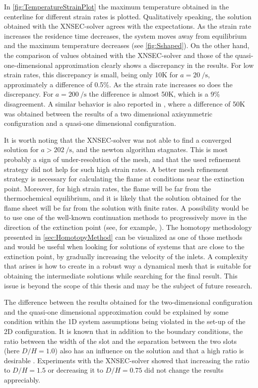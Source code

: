  
In \cref{fig:TemperatureStrainPlot} the maximum temperature obtained in the centerline for different strain rates is plotted. Qualitatively speaking, the solution obtained with the XNSEC-solver agrees with the expectations. As the strain rate increases the residence time decreases, the system moves away from equilibrium and the maximum temperature decreases (see \cref{fig:Sshaped}). On the other hand, the comparison of values obtained with the XNSEC-solver and those of the quasi-one-dimensional approximation clearly shows a discrepancy in the results. For low strain rates, this discrepancy is small, being only 10K for  $a = \SI{20}{\per\second}$, approximately a difference of 0.5\%. As the strain rate increases so does the discrepancy. For $a = \SI{200}{\per\second}$ the difference is almost 50K, which is a 9\% disagreement. A similar behavior is also reported in \textcite{frouzakisTwodimensionalDirectNumerical1998}, where a difference of 50K was obtained between the results of a two dimensional axisymmetric configuration and a quasi-one dimensional configuration. 

It is worth noting that the XNSEC-solver was not able to find a converged solution for $a > \SI{202}{\per\second}$, and the newton algorithm stagnates. This is most probably a sign of under-resolution of the mesh, and that the used refinement strategy did not help for such high strain rates. A better mesh refinement strategy is necessary for calculating the flame at conditions near the extinction point. 
Moreover, for high strain rates, the flame will be far from the thermochemical equilibrium, and it is likely that the solution obtained for the flame sheet will be far from the solution with finite rates. A possibility would be to use one of the well-known continuation methods to progressively move in the direction of the extinction point (see, for example, \textcite{nishiokaFlamecontrollingContinuationMethod1996}). The homotopy methodology presented in \cref{sec:HomotopyMethod} can be visualized as one of those methods and would be useful when looking for solutions of systems that are close to the extinction point, by gradually increasing the velocity of the inlets. A complexity that arises is how to create in a robust way a dynamical mesh that is suitable for obtaining the intermediate solutions while searching for the final result. This issue is beyond the scope of this thesis and may be the subject of future research.


The difference between the results obtained for the two-dimensional configuration and the quasi-one dimensional approximation could be explained by some condition within the 1D system assumptions being violated in the set-up of the 2D configuration. It is known that in addition to the boundary conditions, the ratio between the width of the slot and the separation between the two slots (here $D/H = 1.0$) also has an influence on the solution and that a high ratio is desirable \parencite{frouzakisTwodimensionalDirectNumerical1998}. Experiments with the XNSEC-solver showed that increasing the ratio to $D/H = 1.5$  or decreasing it to $D/H = 0.75$ did not change the results appreciably.

